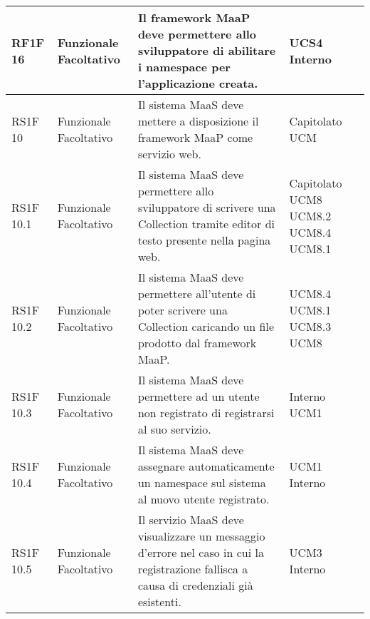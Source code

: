 \begin{center}
\begin{longtable}{ | l | p{2cm} | p{5cm} | p{1.7cm} |}
        RF1F 16 & Funzionale \newline  Facoltativo  & Il framework MaaP deve permettere allo sviluppatore di abilitare i namespace per l'applicazione creata. &  UCS4 \newline  Interno \newline  \\ \hline      
        RS1F 10 & Funzionale \newline  Facoltativo  & Il sistema MaaS deve mettere a disposizione il framework MaaP come servizio web. &  Capitolato \newline  UCM \newline  \\ \hline      
        RS1F 10.1 & Funzionale \newline  Facoltativo  & Il sistema MaaS deve permettere allo sviluppatore di scrivere una Collection tramite editor di testo presente nella pagina web. &  Capitolato \newline  UCM8 \newline  UCM8.2 \newline  UCM8.4 \newline  UCM8.1 \newline  \\ \hline      
        RS1F 10.2 & Funzionale \newline  Facoltativo  & Il sistema MaaS deve permettere all'utente di poter scrivere una Collection caricando un file prodotto dal framework MaaP. &  UCM8.4 \newline  UCM8.1 \newline  UCM8.3 \newline  UCM8 \newline  \\ \hline      
        RS1F 10.3 & Funzionale \newline  Facoltativo  & Il sistema MaaS deve permettere ad un utente non registrato di registrarsi al suo servizio. &  Interno \newline  UCM1 \newline  \\ \hline      
        RS1F 10.4 & Funzionale \newline  Facoltativo  & Il sistema MaaS deve assegnare automaticamente un namespace sul sistema al nuovo utente registrato. &  UCM1 \newline  Interno \newline  \\ \hline      
        RS1F 10.5 & Funzionale \newline  Facoltativo  & Il servizio MaaS deve visualizzare un messaggio d'errore nel caso in cui la registrazione fallisca a causa di credenziali già esistenti. &  UCM3 \newline  Interno \newline  \\ \hline      

\end{longtable}
\end{center}

